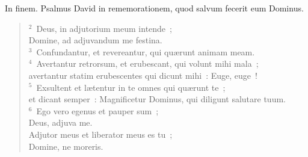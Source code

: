 \bchapter
\lettrine[lines=3,image=true,loversize=0.05,lraise=-0.03]{I}{}n finem. Psalmus David in rememorationem, quod salvum fecerit eum Dominus.
\begin{flushleft}\begin{verse}\vspace{6pt}${}^{2}$~Deus, in adjutorium meum intende~;\\ Domine, ad adjuvandum me festina.\\
${}^{3}$~Confundantur, et revereantur, qui qu\ae runt animam meam.\\
${}^{4}$~Avertantur retrorsum, et erubescant, qui volunt mihi mala~;\\ avertantur statim erubescentes qui dicunt mihi~: Euge, euge~!\\
${}^{5}$~Exsultent et l\ae tentur in te omnes qui qu\ae runt te~;\\ et dicant semper~: Magnificetur Dominus, qui diligunt salutare tuum.\\
${}^{6}$~Ego vero egenus et pauper sum~;\\ Deus, adjuva me.\\ Adjutor meus et liberator meus es tu~;\\ Domine, ne moreris.\end{verse}\end{flushleft}



